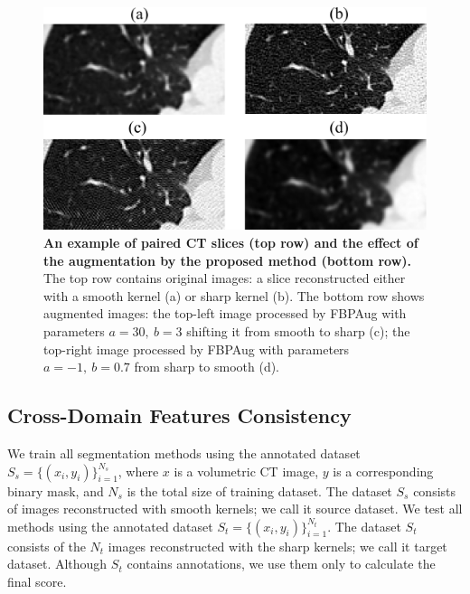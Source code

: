 

\begin{figure}[h]
	\centering
	\includegraphics[width=\linewidth]{Dissertation/Figures/3_ct/4crops.png}%
	\caption{\textbf{An example of paired CT slices (top row) and the effect of the augmentation by the proposed method (bottom row).} The top row contains original images: a slice reconstructed either with a smooth kernel (a) or sharp kernel (b). The bottom row shows augmented images: the top-left image processed by FBPAug with parameters $a=30,~b=3$ shifting it from smooth to sharp (c); the top-right image processed by FBPAug with parameters $a=-1,~b=0.7$ from sharp to smooth (d).}
	\label{fig:crops}
\end{figure}


\subsection{Cross-Domain Features Consistency}

We train all segmentation methods using the annotated dataset $S_s = \{ ( x_i, y_i ) \}_{i=1}^{N_s}$, where $x$ is a volumetric CT image, $y$ is a corresponding binary mask, and $N_s$ is the total size of training dataset. The dataset $S_s$ consists of images reconstructed with smooth kernels; we call it source dataset. We test all methods using the annotated dataset $S_t = \{ ( x_i, y_i ) \}_{i=1}^{N_t}$. The dataset $S_t$ consists of the $N_t$ images reconstructed with the sharp kernels; we call it target dataset. Although $S_t$ contains annotations, we use them only to calculate the final score.

